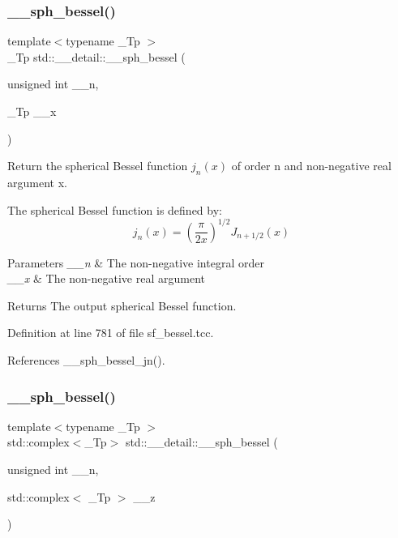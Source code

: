 \subsubsection{\texorpdfstring{\+\_\+\+\_\+sph\+\_\+bessel()}{\_\_sph\_bessel()}\hspace{0.1cm}{\footnotesize\ttfamily [1/2]}}
{\footnotesize\ttfamily template$<$typename \+\_\+\+Tp $>$ \\
\+\_\+\+Tp std\+::\+\_\+\+\_\+detail\+::\+\_\+\+\_\+sph\+\_\+bessel (\begin{DoxyParamCaption}\item[{unsigned int}]{\+\_\+\+\_\+n,  }\item[{\+\_\+\+Tp}]{\+\_\+\+\_\+x }\end{DoxyParamCaption})}



Return the spherical Bessel function $ j_n(x) $ of order n and non-\/negative real argument {\ttfamily x}. 

The spherical Bessel function is defined by\+: \[ j_n(x) = \left(\frac{\pi}{2x} \right) ^{1/2} J_{n+1/2}(x) \]


\begin{DoxyParams}{Parameters}
{\em \+\_\+\+\_\+n} & The non-\/negative integral order \\
\hline
{\em \+\_\+\+\_\+x} & The non-\/negative real argument \\
\hline
\end{DoxyParams}
\begin{DoxyReturn}{Returns}
The output spherical Bessel function. 
\end{DoxyReturn}


Definition at line 781 of file sf\+\_\+bessel.\+tcc.



References \+\_\+\+\_\+sph\+\_\+bessel\+\_\+jn().

\mbox{\label{namespacestd_1_1____detail_a28646bd01903e6da9871069a9363c593}} 
\subsubsection{\texorpdfstring{\+\_\+\+\_\+sph\+\_\+bessel()}{\_\_sph\_bessel()}\hspace{0.1cm}{\footnotesize\ttfamily [2/2]}}
{\footnotesize\ttfamily template$<$typename \+\_\+\+Tp $>$ \\
std\+::complex$<$\+\_\+\+Tp$>$ std\+::\+\_\+\+\_\+detail\+::\+\_\+\+\_\+sph\+\_\+bessel (\begin{DoxyParamCaption}\item[{unsigned int}]{\+\_\+\+\_\+n,  }\item[{std\+::complex$<$ \+\_\+\+Tp $>$}]{\+\_\+\+\_\+z }\end{DoxyParamCaption})}



